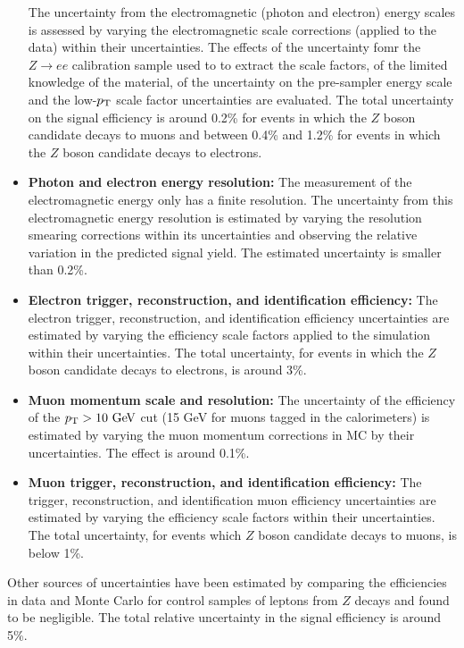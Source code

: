 \begin{itemize}
The uncertainty from the electromagnetic (photon and electron) energy
scales is assessed by varying the electromagnetic scale corrections (applied
to the data) within their uncertainties. The effects of the uncertainty fomr
the $Z \to ee$ calibration sample used to to extract the scale factors, of the
limited knowledge of the material, of the uncertainty on the pre-sampler energy 
scale and the low-$p_{\mathrm{T}}$ scale factor uncertainties are evaluated. The total
uncertainty on the signal efficiency is around 0.2\% for events in which
the $Z$ boson candidate decays to muons and between 0.4\% and 1.2\% for
events in which the $Z$ boson candidate decays to electrons.
%
\item \textbf{Photon and electron energy resolution:}
The measurement of the electromagnetic energy only has a finite resolution.
The uncertainty from this electromagnetic energy resolution is estimated by
varying the resolution smearing corrections within its uncertainties and
observing the relative variation in the predicted signal yield. The estimated
uncertainty is smaller than 0.2\%.
%
\item \textbf{Electron trigger, reconstruction, and identification efficiency:}
The electron trigger, reconstruction, and identification efficiency uncertainties
are estimated by varying the efficiency scale factors applied to the simulation within
their uncertainties. The total uncertainty, for events in which the $Z$ boson
candidate decays to electrons, is around 3\%.
%
\item \textbf{Muon momentum scale and resolution:} 
The uncertainty of the efficiency of the $\pt > 10 \GeV$ cut (15 GeV for muons
tagged in the calorimeters) is estimated by varying the muon momentum
corrections in MC by their uncertainties. The effect is around 0.1\%.
%
\item \textbf{Muon trigger, reconstruction, and identification efficiency:}
The trigger, reconstruction, and identification muon efficiency uncertainties
are estimated by varying the efficiency scale factors within their uncertainties.
The total uncertainty, for events which $Z$ boson candidate decays to muons, is
below 1\%.
\end{itemize}
Other sources of uncertainties have been estimated by comparing the efficiencies
in data and Monte Carlo for control samples of leptons from $Z$ decays and found to
be negligible. The total relative uncertainty in the signal efficiency is around 5\%.

